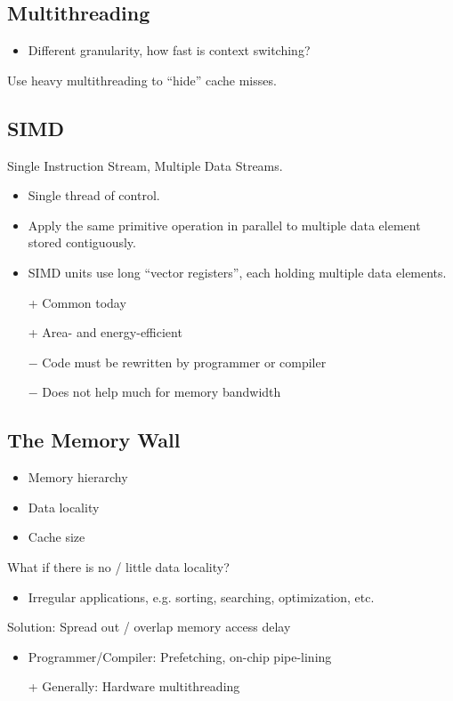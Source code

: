 \documentclass[a4paper]{article}
\begin{document}
\subsection{Multithreading}
\begin{itemize}
  \item Different granularity, how fast is context switching?
\end{itemize}
Use heavy multithreading to ``hide'' cache misses.

\subsection{SIMD}
Single Instruction Stream, Multiple Data Streams.\\
\begin{itemize}
  \item Single thread of control.
  \item Apply the same primitive operation in parallel to multiple data element
    stored contiguously. 
  \item SIMD units use long ``vector registers'', each holding multiple data
    elements.
\end{itemize}

\begin{itemize}
  \item[+] Common today
  \item[+] Area- and energy-efficient
  \item[$-$] Code must be rewritten by programmer or compiler
  \item[$-$] Does not help much for memory bandwidth
\end{itemize}
\subsection{The Memory Wall}
\begin{itemize}
  \item Memory hierarchy
  \item Data locality
  \item Cache size
\end{itemize}

What if there is no / little data locality?
\begin{itemize}
  \item Irregular applications, e.g. sorting, searching, optimization, etc.
\end{itemize}

Solution: Spread out / overlap memory access delay
\begin{itemize}
  \item Programmer/Compiler: Prefetching, on-chip pipe-lining
  \item[+] Generally: Hardware multithreading
\end{itemize}
\end{document}

